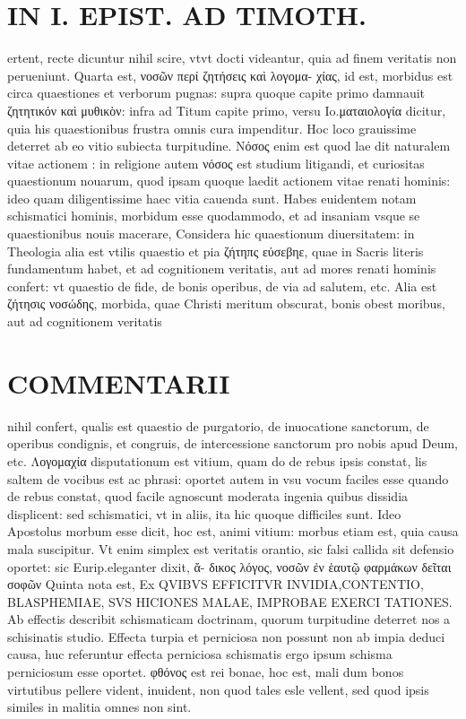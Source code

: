 \documentclass{article}
\begin{document}
\begin{pages}
\section*{IN I. EPIST. AD TIMOTH. }
\marginpar{[ p.151 ]}\pstart ertent, recte dicuntur nihil scire, vtvt docti videantur, quia ad finem veritatis non perueniunt.  \pend\pstart Quarta est, νοσῶν περί ζητήσεις καὶ λογομα- χίας, id est, morbidus est circa quaestiones et verborum pugnas: supra quoque capite primo damnauit ζητητικόν καὶ μυθικὸν: infra ad Titum capite primo, versu Io.ματαιολογία dicitur, quia his quaestionibus frustra omnis cura impenditur. Hoc loco grauissime deterret ab eo vitio subiecta turpitudine. Νόσος  enim est quod lae dit naturalem vitae actionem : in religione autem νόσος est studium litigandi, et curiositas quaestionum nouarum, quod ipsam quoque laedit actionem vitae renati hominis: ideo quam diligentissime haec vitia cauenda sunt. Habes euidentem notam schismatici hominis, morbidum esse quodammodo, et ad insaniam vsque se quaestionibus nouis macerare, Considera hic quaestionum diuersitatem: in Theologia alia est vtilis quaestio et pia ζήτηπς εὐσεβηε, quae in Sacris literis fundamentum habet, et ad cognitionem veritatis, aut ad mores renati hominis confert: vt quaestio de fide, de bonis operibus, de via ad salutem, etc. Alia est ζήτησις νοσώδης, morbida, quae Christi meritum obscurat, bonis obest moribus, aut ad cognitionem veritatis  \pend
\section*{COMMENTARII }
\marginpar{[ p.152 ]}\pstart nihil confert, qualis est quaestio de purgatorio, de inuocatione sanctorum, de operibus condignis, et congruis, de intercessione sanctorum pro nobis apud Deum, etc.  \pend\pstart Λογομαχία disputationum est vitium, quam do de rebus ipsis constat, lis saltem de vocibus est ac phrasi: oportet autem in vsu vocum faciles esse quando de rebus constat, quod facile agnoscunt moderata ingenia quibus dissidia displicent: sed schismatici, vt in aliis, ita hic quoque difficiles sunt. Ideo Apostolus morbum esse dicit, hoc est, animi vitium: morbus etiam est, quia causa mala suscipitur. Vt enim simplex est veritatis orantio, sic falsi callida sit defensio oportet: sic Eurip.eleganter dixit, ἄ- δικος λόγος, νοσῶν ἐν ἑαυτῷ φαρμάκων δεῖται σοφῶν  \pend\pstart Quinta nota est, Ex QVIBVS EFFICITVR INVIDIA,CONTENTIO, BLASPHEMIAE, SVS HICIONES MALAE, IMPROBAE EXERCI TATIONES. Ab effectis describit schismaticam doctrinam, quorum turpitudine deterret nos a schisinatis studio. Effecta turpia et perniciosa non possunt non ab impia deduci causa, huc referuntur effecta perniciosa schismatis ergo ipsum schisma perniciosum esse oportet. φθόνος est rei bonae, hoc est, mali dum bonos virtutibus pellere vident, inuident, non quod tales esle vellent, sed quod ipsis similes in malitia omnes non sint.  \pend

\end{pages}
\end{document}
